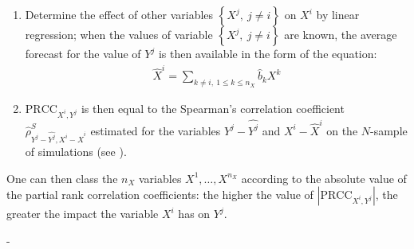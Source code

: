 {\begin{enumerate}
  \item Determine the effect of other variables $\left\{ X^j,\ j\neq i \right\}$ on $X^i$ by linear regression; when the values of variable $\left\{ X^j,\ j\neq i \right\}$ are known, the average forecast for the value of $Y^j$ is then available in the form of the equation:
    \begin{align*}
      \widehat{X}^i = \sum_{k \neq i,\ 1 \leq k \leq n_X} \widehat{b}_k X^k
    \end{align*}

  \item $\textrm{PRCC}_{X^i,Y^j}$ is then equal to the Spearman's correlation coefficient $\widehat{\rho}^S_{Y^j-\widehat{Y^j},X^i-\widehat{X}^i}$  estimated for the variables  $Y^j-\widehat{Y^j}$ and $X^i-\widehat{X}^i$ on the $N$-sample of simulations (see ).
  \end{enumerate}

  One can then class the $n_X$ variables $X^1,\ldots, X^{n_X}$ according to the absolute value of the partial rank correlation coefficients: the higher the value of $\left| \textrm{PRCC}_{X^i,Y^j} \right|$, the greater the impact the variable $X^i$ has on $Y^j$.
}
{
  -
}

